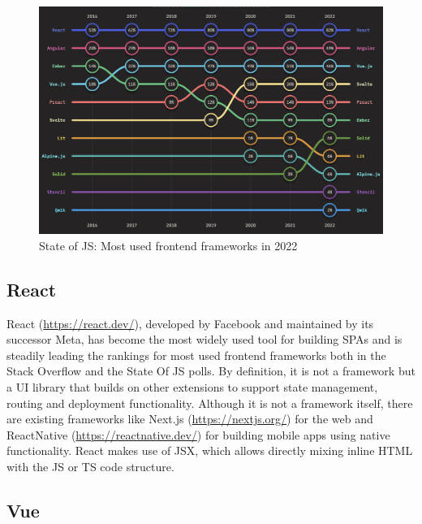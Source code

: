 \begin{figure}[h]
    \centering
    \includegraphics[scale=0.4]{04_Artefakte/01_Abbildungen/stateofjs-usage-frontend-frameworks-2022}
    \caption[Most used frontend frameworks in 2022]{State of JS: Most used frontend frameworks in 2022\protect\footnotemark}
    \label{fig:mostUsedFrameworks}
\end{figure}

\subsection{React}

React (\url{https://react.dev/}), developed by Facebook and maintained by its successor Meta, has become the most widely used tool for building \ac{SPA}s and is steadily leading the rankings for most used frontend frameworks both in the Stack Overflow \parencite{stackOverflowPollWebFrameworks23} and the State Of JS \parencite{mostUsedFrontendFrameworks22} polls. By definition, it is not a framework but a \ac{UI} library that builds on other extensions to support state management, routing and deployment functionality. Although it is not a framework itself, there are existing frameworks like Next.js (\url{https://nextjs.org/}) for the web and ReactNative (\url{https://reactnative.dev/}) for building mobile apps using native functionality. React makes use of \ac{JSX}, which allows directly mixing inline \ac{HTML} with the \ac{JS} or \ac{TS} code structure.

\subsection{Vue}

